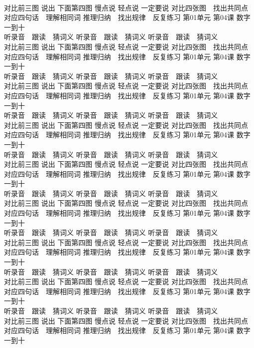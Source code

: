 \documentclass[8pt]{extreport}
\begin{document}
\begin{CJK}{UTF8}{min}
\\	对比前三图 说出 下面第四图 慢点说 轻点说 一定要说	对比四张图　找出共同点 对应四句话　理解相同词 推理归纳　找出规律　反复练习 第01单元 第04课 数字一到十
\\	听录音　跟读　猜词义 听录音　跟读　猜词义 听录音　跟读　猜词义 
\\	对比前三图 说出 下面第四图 慢点说 轻点说 一定要说	对比四张图　找出共同点 对应四句话　理解相同词 推理归纳　找出规律　反复练习 第01单元 第04课 数字一到十
\\	听录音　跟读　猜词义 听录音　跟读　猜词义 听录音　跟读　猜词义 
\\	对比前三图 说出 下面第四图 慢点说 轻点说 一定要说	对比四张图　找出共同点 对应四句话　理解相同词 推理归纳　找出规律　反复练习 第01单元 第04课 数字一到十
\\	听录音　跟读　猜词义 听录音　跟读　猜词义 听录音　跟读　猜词义 
\\	对比前三图 说出 下面第四图 慢点说 轻点说 一定要说	对比四张图　找出共同点 对应四句话　理解相同词 推理归纳　找出规律　反复练习 第01单元 第04课 数字一到十
\\	听录音　跟读　猜词义 听录音　跟读　猜词义 听录音　跟读　猜词义 
\\	对比前三图 说出 下面第四图 慢点说 轻点说 一定要说	对比四张图　找出共同点 对应四句话　理解相同词 推理归纳　找出规律　反复练习 第01单元 第04课 数字一到十
\\	听录音　跟读　猜词义 听录音　跟读　猜词义 听录音　跟读　猜词义 
\\	对比前三图 说出 下面第四图 慢点说 轻点说 一定要说	对比四张图　找出共同点 对应四句话　理解相同词 推理归纳　找出规律　反复练习 第01单元 第04课 数字一到十
\\	听录音　跟读　猜词义 听录音　跟读　猜词义 听录音　跟读　猜词义 
\\	对比前三图 说出 下面第四图 慢点说 轻点说 一定要说	对比四张图　找出共同点 对应四句话　理解相同词 推理归纳　找出规律　反复练习 第01单元 第04课 数字一到十
\\	听录音　跟读　猜词义 听录音　跟读　猜词义 听录音　跟读　猜词义 
\\	对比前三图 说出 下面第四图 慢点说 轻点说 一定要说	对比四张图　找出共同点 对应四句话　理解相同词 推理归纳　找出规律　反复练习 第01单元 第04课 数字一到十
\\	听录音　跟读　猜词义 听录音　跟读　猜词义 听录音　跟读　猜词义 
\\	对比前三图 说出 下面第四图 慢点说 轻点说 一定要说	对比四张图　找出共同点 对应四句话　理解相同词 推理归纳　找出规律　反复练习 第01单元 第04课 数字一到十

\end{CJK}
\end{document}
